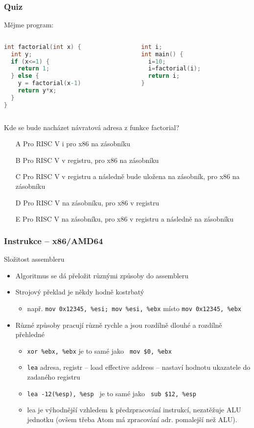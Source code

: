 \documentclass{beamer}
\begin{document}
\begin{frame}[fragile,shrink=10]
\frametitle{Quiz}

Mějme program:
\begin{columns}
\begin{column}{0.45\textwidth}
\begin{lstlisting}[language={C},columns=flexible]
int factorial(int x) {
  int y;
  if (x<=1) {
    return 1;
  } else {
    y = factorial(x-1)
    return y*x;
  }
}
\end{lstlisting}
\end{column}
\hfill
\begin{column}{0.45\textwidth}  
\begin{lstlisting}[language={C},columns=flexible]
int i;
int main() {
  i=10;
  i=factorial(i);
  return i;
}
\end{lstlisting}
\end{column}
\end{columns}

Kde se bude nacházet návratová adresa z funkce factorial?
\begin{itemize}
\item[A] Pro RISC V i pro x86 na zásobníku
\item[B] Pro RISC V v registru, pro x86 na zásobníku
\item[C] Pro RISC V v registru a následně bude uložena na zásobník, pro x86 na zásobníku
\item[D] Pro RISC V na zásobníku, pro x86 v registru
\item[E] Pro RISC V na zásobníku, pro x86 v registru a následně na zásobníku
\end{itemize}
\end{frame}



\begin{frame}
\frametitle{Instrukce – x86/AMD64}
Složitost assembleru
\begin{itemize}
\item Algoritmus se dá přeložit různými způsoby do assembleru
\item Strojový překlad je někdy hodně kostrbatý
\begin{itemize}
\item např. \texttt{mov 0x12345, \%esi; mov \%esi, \%ebx} místo \texttt{mov 0x12345, \%ebx}
\end{itemize}
\item Různé způsoby pracují různě rychle a jsou rozdílně dlouhé a rozdílně přehledné
\begin{itemize}
\item \texttt{xor \%ebx, \%ebx}  je to samé jako \texttt{ mov \$0, \%ebx}
\item \texttt{lea} adresa, registr – load effective address – nastaví hodnotu ukazatele do zadaného registru
\item \texttt{lea   -12(\%esp), \%esp }  je to samé jako \texttt{ sub    \$12, \%esp} 
\item lea je výhodnější vzhledem k předzpracování instrukcí, nezatěžuje ALU jednotku (ovšem třeba Atom má zpracování adr. pomalejší než ALU).
\end{itemize}
\end{itemize}
\end{frame}
\end{document}
